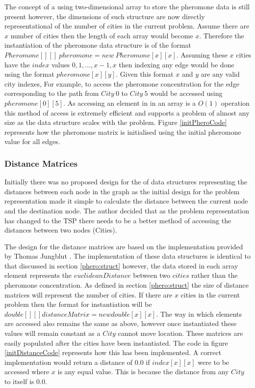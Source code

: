 The concept of a using two-dimensional array to store the pheromone data is still present however, the dimensions of such structure are now directly representational of the number of cities in the current problem. Assume there are $x$ number of cities then the length of each array would become $x$. Therefore the instantiation of the pheromone data structure is of the format $Pheromone[][]\  pheromone = new\ Pheromone[x][x]$. Assuming these $x$ cities have the $index$ values $0, 1, ..., x-1, x$ then indexing any edge would be done using the format $pheromone[x][y]$. Given this format $x$ and $y$ are any valid city indexes, For example, to access the pheromone concentration for the edge corresponding to the path from $City\ 0$ to $City\ 5$ would be accessed using $pheromone[0][5]$. As accessing an element in in an array is a $O(1)$ operation this method of access is extremely efficient and supports a problem of almost any size as the data structure scales with the problem. Figure \ref{initPheroCode} represents how the pheromone matrix is initialised using the initial pheromone value for all edges.

\subsubsection{Distance Matrices}

Initially there was no proposed design for the of data structures representing the distances between each node in the graph as the initial design for the problem representation made it simple to calculate the distance between the current node and the destination node. The author decided that as the problem representation has changed to the TSP there needs to be a better method of accessing the distances between two nodes (Cities).

The design for the distance matrices are based on the implementation provided by Thomas Jungblut \cite{tjung:aco:blog}. The implementation of these data structures is identical to that discussed in section \ref{phero:struct} however, the data stored in each array element represents the $euclideanDistance$ between two $cities$ rather than the pheromone concentration. As defined in section \ref{phero:struct} the size of distance matrices will represent the number of cities. If there are $x$ cities in the current problem then the format for instantiation will be $double[][] distanceMatrix = new double[x][x]$. The way in which elements are accessed also remains the same as above, however once instantiated these values will remain constant as a $City$ cannot move location. These matrices are easily populated after the cities have been instantiated. The code in figure \ref{initDistanceCode} represents how this has been implemented. A correct implementation would return a distance of $0.0$ if $index[x][x]$ were to be accessed where $x$ is any equal value. This is because the distance from any $City$ to itself is $0.0$.


